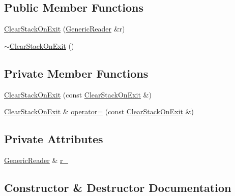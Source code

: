 \subsection*{Public Member Functions}
\begin{DoxyCompactItemize}
\item 
\hyperlink{structGenericReader_1_1ClearStackOnExit_a74f8b1f772229a3b2eb1d26ba4b58eca}{Clear\+Stack\+On\+Exit} (\hyperlink{classGenericReader}{Generic\+Reader} \&r)
\item 
\hyperlink{structGenericReader_1_1ClearStackOnExit_ab6035e502faee35e21fb1c9a9043a230}{$\sim$\+Clear\+Stack\+On\+Exit} ()
\end{DoxyCompactItemize}
\subsection*{Private Member Functions}
\begin{DoxyCompactItemize}
\item 
\hyperlink{structGenericReader_1_1ClearStackOnExit_ab276cf5b396da397f4ec05d6a29139a9}{Clear\+Stack\+On\+Exit} (const \hyperlink{structGenericReader_1_1ClearStackOnExit}{Clear\+Stack\+On\+Exit} \&)
\item 
\hyperlink{structGenericReader_1_1ClearStackOnExit}{Clear\+Stack\+On\+Exit} \& \hyperlink{structGenericReader_1_1ClearStackOnExit_acf3f83e842ebbe256c86d52e36a044c3}{operator=} (const \hyperlink{structGenericReader_1_1ClearStackOnExit}{Clear\+Stack\+On\+Exit} \&)
\end{DoxyCompactItemize}
\subsection*{Private Attributes}
\begin{DoxyCompactItemize}
\item 
\hyperlink{classGenericReader}{Generic\+Reader} \& \hyperlink{structGenericReader_1_1ClearStackOnExit_a6805ebb172f278c65ec7fc61847eb08d}{r\+\_\+}
\end{DoxyCompactItemize}


\subsection{Constructor \& Destructor Documentation}
\mbox{\label{structGenericReader_1_1ClearStackOnExit_a74f8b1f772229a3b2eb1d26ba4b58eca}} 
